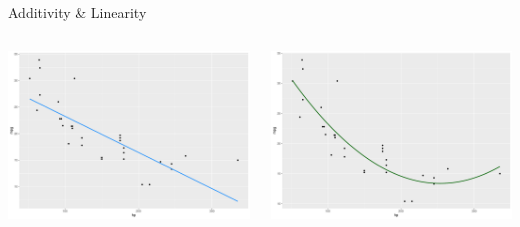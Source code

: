 \documentclass[
  ignorenonframetext,
]{beamer}
\begin{document}
\begin{frame}{Additivity \& Linearity}
\protect\hypertarget{additivity-linearity-1}{}
\begin{columns}[T]
\begin{column}{0.5\textwidth}
\includegraphics{bias_files/figure-beamer/unnamed-chunk-8-1.pdf}
\end{column}

\begin{column}{0.5\textwidth}
\includegraphics{bias_files/figure-beamer/unnamed-chunk-10-1.pdf}
\end{column}
\end{columns}
\end{frame}
\end{document}
